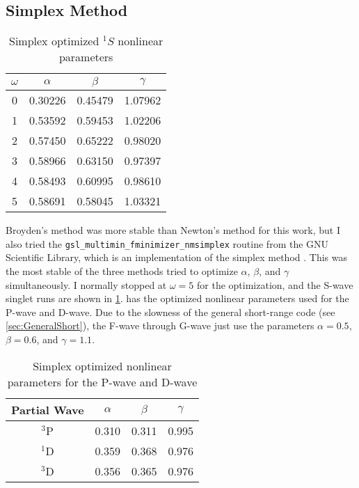 \documentclass[Dissertation.tex]{subfiles}
\begin{document}
\subsection{Simplex Method}
\label{sec:Simplex}

\begin{table}[H]
\centering
\begin{tabular}{c c c c}
\toprule
$\omega$ & $\alpha$ & $\beta$ & $\gamma$ \\ [0.5ex]
\midrule
0 & 0.30226 & 0.45479 & 1.07962 \\
1 & 0.53592 & 0.59453 & 1.02206 \\
2 & 0.57450 & 0.65222 & 0.98020 \\
3 & 0.58966 & 0.63150 & 0.97397 \\
4 & 0.58493 & 0.60995 & 0.98610 \\
5 & 0.58691 & 0.58045 & 1.03321 \\
\bottomrule
\end{tabular}
\caption{Simplex optimized $^1S$ nonlinear parameters}
\label{tab:NonlinearOptimized1SSimplex}
\end{table}

Broyden's method was more stable than Newton's method for this work, but I also tried the \texttt{gsl\_multimin\_fminimizer\_nmsimplex} routine from the GNU Scientific Library, which is an implementation of the simplex method \cite{GSL,GSLsimplex}. This was the most stable of the three methods tried to optimize $\alpha$, $\beta$, and $\gamma$ simultaneously. I normally stopped at $\omega = 5$ for the optimization, and the S-wave singlet runs are shown in \cref{tab:NonlinearOptimized1SSimplex}.  has the optimized nonlinear parameters used for the P-wave and D-wave. Due to the slowness of the general short-range code (see \cref{sec:GeneralShort}), the F-wave through G-wave just use the parameters $\alpha = 0.5$, $\beta = 0.6$, and $\gamma = 1.1$.

\begin{table}[H]
\small
\centering
\begin{tabular}{c c c c}
\toprule
Partial Wave & $\alpha$ & $\beta$ & $\gamma$ \\
\midrule
$^3$P & 0.310 & 0.311 & 0.995 \\
$^1$D & 0.359 & 0.368 & 0.976 \\
$^3$D & 0.356 & 0.365 & 0.976 \\
\bottomrule
\end{tabular}
\caption{Simplex optimized nonlinear parameters for the P-wave and D-wave}
\label{tab:NonlinearOptimizedPD}
\end{table}
\end{document}
